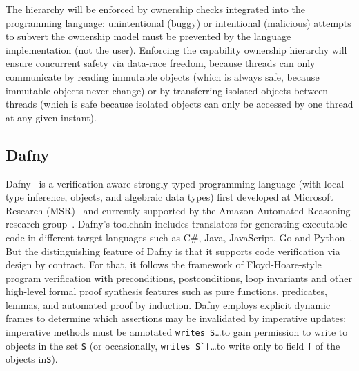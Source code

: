 %
%
The hierarchy will be enforced by ownership checks integrated into
the programming language: unintentional (buggy) or 
intentional (malicious) attempts to subvert the ownership
model must be prevented by the language implementation (not the user).
%
Enforcing the capability ownership hierarchy will
ensure concurrent safety via data-race freedom, because
threads can only communicate by reading immutable objects (which is
always safe, because immutable objects never change) or by
transferring isolated objects between threads (which is safe because
isolated objects can only be accessed by one thread at any given
instant).




\subsection{Dafny}
Dafny~\cite{dafnytsite} is a verification-aware strongly typed programming language 
(with local type inference, objects, and algebraic data types)
first developed at Microsoft Research (MSR)~\cite{microsoftresearch} and  currently supported by the Amazon Automated Reasoning research group~\cite{awsautomatedreasoning}. Dafny's toolchain includes translators for generating executable code in different target languages such as C\#, Java, JavaScript, Go and Python~\cite{dafny-github}. But the distinguishing feature of Dafny is that it supports code verification via design by contract. For that, it follows the framework of Floyd-Hoare-style ~\cite{DBLP:journals/cacm/Hoare69} program verification with preconditions, postconditions, loop invariants and other high-level formal proof synthesis features such as pure functions, predicates, lemmas, and automated proof by induction. Dafny employs explicit dynamic frames to determine which assertions may be invalidated by imperative updates: imperative methods must be annotated \lstinline+writes S+\ldots to gain permission to write to objects in the set \lstinline+S+ (or occasionally, \lstinline+writes S`f+\ldots to write only to field \lstinline+f+ of the objects in\lstinline+S+).


